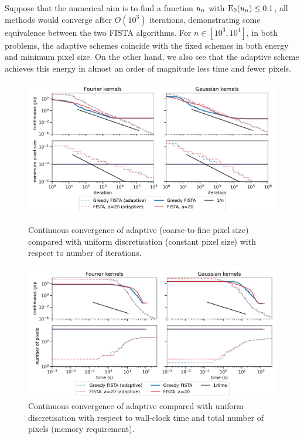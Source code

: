 \documentclass[smallextended]{svjour3}
\newcommand{\op}[1]{\operatorname{#1}}
\newcommand{\1}{\F{1}}
\newcommand*{\var}[1]{%
	\IfEqCase{#1}{%
		{0}{u}%
		{1}{v}%
		{2}{w}%
	}[u#1]%
}
\begin{document}
	Suppose that the numerical aim is to find a function $\var0_n$ with $\op{E}_0(\var0_n)\leq 0.1$, all methods would converge after $O(10^3)$ iterations, demonstrating some equivalence between the two FISTA algorithms. For $n\in[10^3,10^4]$, in both problems, the adaptive schemes coincide with the fixed schemes in both energy and minimum pixel size. On the other hand, we also see that the adaptive scheme achieves this energy in almost an order of magnitude less time and fewer pixels.
	
	\begin{figure}\centering
		\includegraphics[width=.86\textwidth]{lasso_reduced_convergence}
		\caption{Continuous convergence of adaptive (coarse-to-fine pixel size) compared with uniform discretisation (constant pixel size) with respect to number of iterations. }\label{fig: comparison with iteration}
		
		\vspace*{\floatsep}
		
		\includegraphics[width=.86\textwidth]{lasso_convergence_time}
		\caption{Continuous convergence of adaptive compared with uniform discretisation with respect to wall-clock time and total number of pixels (memory requirement).}\label{fig: comparison with time}
		
		\vspace*{\floatsep}
		

\end{figure}
\end{document}
